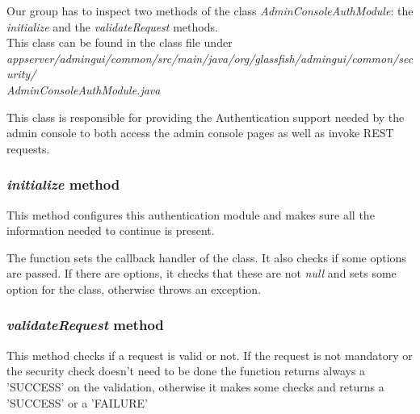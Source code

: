 Our group has to inspect two methods of the class \textit{AdminConsoleAuthModule}: the \textit{initialize} and the \textit{validateRequest} methods.\\
This class can be found in the class file under \textit{appserver/admingui/common/src/main/java/org/glassfish/admingui/common/security/\\AdminConsoleAuthModule.java}

This class is responsible for providing the Authentication support needed by the admin console to both access the admin console pages as well as invoke REST requests.

\subsubsection{\textit{initialize} method}
This method configures this authentication module and makes sure all the information needed to continue is present.

The function sets the callback handler of the class.
It also checks if some options are passed. If there are options, it checks that these are not \textit{null} and sets some option for the class, otherwise throws an exception.


\subsubsection{\textit{validateRequest} method}
This method checks if a request is valid or not. If the request is not mandatory or the security check doesn't need to be done the function returns always a 'SUCCESS' on  the validation, otherwise it makes some checks and returns a 'SUCCESS' or a 'FAILURE'
